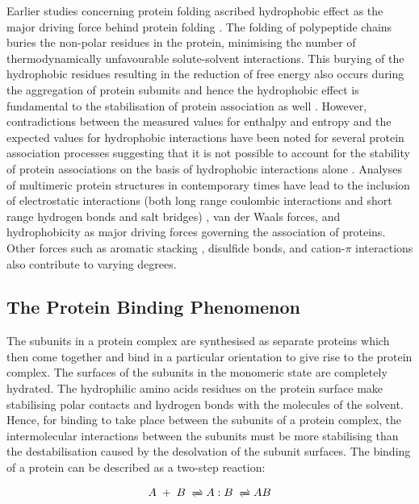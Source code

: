 \par
Earlier studies concerning protein folding ascribed hydrophobic effect as the major driving force behind protein folding \citep{Dill1990}. The folding of polypeptide chains buries the non-polar residues in the protein, minimising the number of thermodynamically unfavourable solute-solvent interactions. This burying of the hydrophobic residues resulting in the reduction of free energy also occurs during the aggregation of protein subunits and hence the hydrophobic effect is fundamental to the stabilisation of protein association as well \citep{Chothia1975}. However, contradictions between the measured values for enthalpy and entropy and the expected values for hydrophobic interactions have been noted for several protein association processes suggesting that it is not possible to account for the stability of protein associations on the basis of hydrophobic interactions alone \citep{Ross1981}. Analyses of multimeric protein structures in contemporary times have lead to the inclusion of electrostatic interactions (both long range coulombic interactions and short range hydrogen bonds and salt bridges) \citep{Xu1997, Sheinerman2000}, van der Waals forces, and hydrophobicity as major driving forces governing the association of proteins. Other forces such as aromatic stacking \citep{Burley1985}, disulfide bonds, and cation-$\displaystyle{\pi}$ interactions \citep{Crowley2005} also contribute to varying degrees.

\subsection{The Protein Binding Phenomenon}
The subunits in a protein complex are synthesised as separate proteins which then come together and bind in a particular orientation to give rise to the protein complex. The surfaces of the subunits in the monomeric state are completely hydrated. The hydrophilic amino acids residues on the protein surface make stabilising polar contacts and hydrogen bonds with the molecules of the solvent. Hence, for binding to take place between the subunits of a protein complex, the intermolecular interactions between the subunits must be more stabilising than the destabilisation caused by the desolvation of the subunit surfaces. The binding of a protein can be described as a two-step reaction:

\begingroup
\large
\begin{equation}
A\;+\;B\; \xrightleftharpoons \; A:B \; \xrightleftharpoons \; AB
\end{equation}
\endgroup

